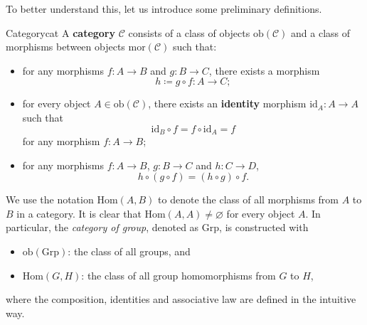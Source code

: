 \documentclass[math]{amznotes}
\theoremstyle{remark}
\newcommand{\0}{\mathbf{0}}
\newcommand{\1}{\mathbf{1}}
\begin{document}
To better understand this, let us introduce some preliminary definitions.
\begin{dfnbox}{Category}{cat}
    A {\color{red} \textbf{category}} $\mathcal{C}$ consists of a class of objects $\mathrm{ob}\left(\mathcal{C}\right)$ and a class of morphisms between objects $\mathrm{mor}\left(\mathcal{C}\right)$ such that:
    \begin{itemize}
        \item for any morphisms $f \colon A \to B$ and $g \colon B \to C$, there exists a morphism 
        \begin{equation*}
            h \coloneqq g \circ f \colon A \to C;
        \end{equation*}
        \item for every object $A \in \mathrm{ob}\left(\mathcal{C}\right)$, there exists an {\color{red} \textbf{identity}} morphism $\mathrm{id}_A \colon A \to A$ such that
        \begin{equation*}
            \mathrm{id}_B \circ f = f \circ \mathrm{id}_A = f
        \end{equation*}
        for any morphism $f \colon A \to B$;
        \item for any morphisms $f \colon A \to B$, $g \colon B \to C$ and $h \colon C \to D$, 
        \begin{equation*}
            h \circ \left(g \circ f\right) = \left(h \circ g\right) \circ f.
        \end{equation*}
    \end{itemize}
\end{dfnbox}
We use the notation $\mathrm{Hom}\left(A, B\right)$ to denote the class of all morphisms from $A$ to $B$ in a category. It is clear that $\mathrm{Hom}\left(A, A\right) \neq \varnothing$ for every object $A$. In particular, the \textit{category of group}, denoted as $\mathrm{Grp}$, is constructed with
\begin{itemize}
    \item $\mathrm{ob}\left(\mathrm{Grp}\right)$: the class of all groups, and 
    \item $\mathrm{Hom}\left(G, H\right)$: the class of all group homomorphisms from $G$ to $H$,
\end{itemize}
where the composition, identities and associative law are defined in the intuitive way.
\end{document}
